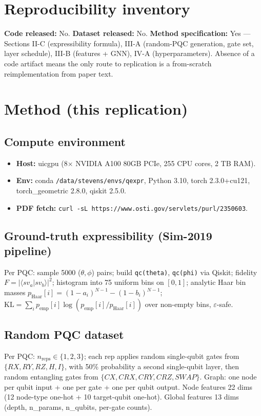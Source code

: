 \documentclass[11pt]{article}
\begin{document}
\section{Reproducibility inventory}
\textbf{Code released:} No. \textbf{Dataset released:} No.
\textbf{Method specification:} Yes --- Sections II-C (expressibility
formula), III-A (random-PQC generation, gate set, layer schedule),
III-B (features + GNN), IV-A (hyperparameters). Absence of a code
artifact means the only route to replication is a from-scratch
reimplementation from paper text.

\section{Method (this replication)}

\subsection{Compute environment}
\begin{itemize}
  \item \textbf{Host:} uicgpu (8\(\times\) NVIDIA A100 80GB PCIe, 255 CPU cores, 2 TB RAM).
  \item \textbf{Env:} conda \verb|/data/stevens/envs/qexpr|, Python 3.10,
        torch 2.3.0+cu121, torch\_geometric 2.8.0, qiskit 2.5.0.
  \item \textbf{PDF fetch:} \verb|curl -sL https://www.osti.gov/servlets/purl/2350603|.
\end{itemize}

\subsection{Ground-truth expressibility (Sim-2019 pipeline)}
Per PQC: sample 5000 (\(\theta,\phi\)) pairs; build \verb|qc(theta)|,
\verb|qc(phi)| via Qiskit; fidelity \(F = |\langle sv_a|sv_b\rangle|^2\);
histogram into 75 uniform bins on \([0,1]\); analytic Haar bin masses
\(p_{\mathrm{Haar}}[i] = (1-a_i)^{N-1} - (1-b_i)^{N-1}\);
\(\mathrm{KL} = \sum_i p_{\mathrm{emp}}[i]\log(p_{\mathrm{emp}}[i]/p_{\mathrm{Haar}}[i])\)
over non-empty bins, \(\varepsilon\)-safe.

\subsection{Random PQC dataset}
Per PQC: \(n_{\mathrm{reps}}\!\in\!\{1,2,3\}\); each rep applies random
single-qubit gates from \(\{RX,RY,RZ,H,I\}\), with 50\% probability a
second single-qubit layer, then random entangling gates from
\(\{CX,CRX,CRY,CRZ,SWAP\}\). Graph: one node per qubit input + one per
gate + one per qubit output. Node features 22 dims (12 node-type one-hot
+ 10 target-qubit one-hot). Global features 13 dims (depth, n\_params,
n\_qubits, per-gate counts).
\end{document}
